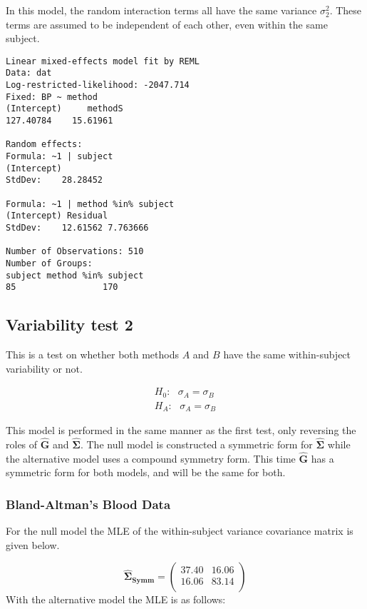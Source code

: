In this model, the random interaction terms all have the same variance $\sigma^2_{2}$. These terms are assumed to be independent of each other, even
within the same subject.

\begin{verbatim}
Linear mixed-effects model fit by REML
Data: dat
Log-restricted-likelihood: -2047.714
Fixed: BP ~ method
(Intercept)     methodS
127.40784    15.61961

Random effects:
Formula: ~1 | subject
(Intercept)
StdDev:    28.28452

Formula: ~1 | method %in% subject
(Intercept) Residual
StdDev:    12.61562 7.763666

Number of Observations: 510
Number of Groups:
subject method %in% subject
85                 170
\end{verbatim}

\subsection{Variability test 2}

This is a test on whether both methods $A$ and $B$ have the same within-subject variability or not.

\begin{eqnarray}
H_{0}: \mbox{ }\sigma_{A}  = \sigma_{B} \\
H_{A}: \mbox{ }\sigma_{A}  = \sigma_{B}
\end{eqnarray}

This model is performed in the same manner as the first test, only reversing the roles of $\boldsymbol{\hat{G}}$ and $\boldsymbol{\hat{\Sigma}}$. The null model is constructed  a symmetric form for $\boldsymbol{\hat{\Sigma}}$ while the alternative model uses a compound symmetry form. This time $\boldsymbol{\hat{G}}$ has a symmetric form for both models, and will be the same for both.


\subsubsection{Bland-Altman's Blood Data}
For the null model the MLE of the within-subject variance covariance matrix is given below.

\begin{equation}
\boldsymbol{\hat{\Sigma}_{Symm}} = \left( \begin{array}{cc}
37.40 & 16.06  \\
16.06 & 83.14  \\
\end{array}\right)
\end{equation}
With the alternative model the MLE is as follows:

